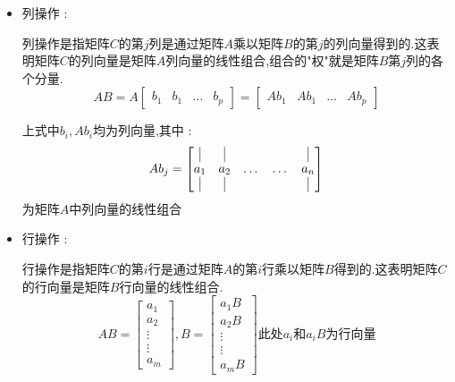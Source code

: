 \documentclass[UTF8,12pt]{ctexbook}
\newcommand{\bookName}[1]{$\ll$#1$\gg$}
\begin{document}
{{{{{\begin{itemize}
{            原理是矩阵相乘可以看作方程组相乘,见\bookName{数学:他的内容,方法和意义}(A.D.亚历山大洛夫)
            }
      \item {
            列操作 :

            列操作是指矩阵$C$的第$j$列是通过矩阵$A$乘以矩阵$B$的第$j$的列向量得到的.这表明矩阵$C$的列向量是矩阵$A$列向量的线性组合,组合的"权"就是矩阵$B$第$j$列的各个分量.
            $$
              AB = A\begin{bmatrix}
                b_1 & b_1 & \dots & b_p
              \end{bmatrix}
              =
              \begin{bmatrix}
                Ab_1 & Ab_1 & \dots & Ab_p
              \end{bmatrix}
            $$

            上式中$b_i,Ab_i$均为列向量,其中 :
            $$
              Ab_j = \begin{bmatrix}
                \vline & \vline & \     & \     & \vline \\
                a_1    & a_2    & \dots & \dots & a_n    \\
                \vline & \vline & \     & \     & \vline
              \end{bmatrix}
            $$
            为矩阵$A$中列向量的线性组合
            }
      \item {
            行操作 :

            行操作是指矩阵$C$的第$i$行是通过矩阵$A$的第$i$行乘以矩阵$B$得到的.这表明矩阵$C$的行向量是矩阵$B$行向量的线性组合.
            $$
              AB = \begin{bmatrix}
                a_1    \\
                a_2    \\
                \vdots \\
                \vdots \\
                a_m
              \end{bmatrix}
              ,
              B = \begin{bmatrix}
                a_1B   \\
                a_2B   \\
                \vdots \\
                \vdots \\
                a_mB
              \end{bmatrix}
              \mbox{此处$a_i$和$a_iB$为行向量}
            $$

}
\end{itemize}}}}}}
\end{document}
